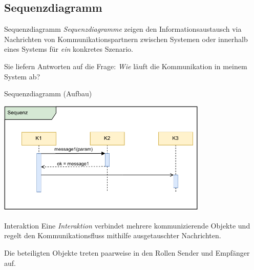 \subsection{Sequenzdiagramm}

\begin{defi}{Sequenzdiagramm}
    \emph{Sequenzdiagramme} zeigen den Informationsaustausch via Nachrichten von Kommunikationspartnern zwischen Systemen oder innerhalb eines Systems für \emph{ein} konkretes Szenario.

    Sie liefern Antworten auf die Frage:
    \emph{Wie} läuft die Kommunikation in meinem System ab?
\end{defi}

\begin{diag}{Sequenzdiagramm (Aufbau)}
    \begin{center}
        \includegraphics[width=0.75\textwidth]{includes/figures/defi_diagrams_sequenz_intro.pdf}
    \end{center}
\end{diag}

\begin{diag}{Interaktion}
    Eine \emph{Interaktion} verbindet mehrere kommunizierende Objekte und regelt den Kommunikationsfluss mithilfe ausgetauschter Nachrichten.

    Die beteiligten Objekte treten paarweise in den Rollen Sender und Empfänger auf.
\end{diag}

